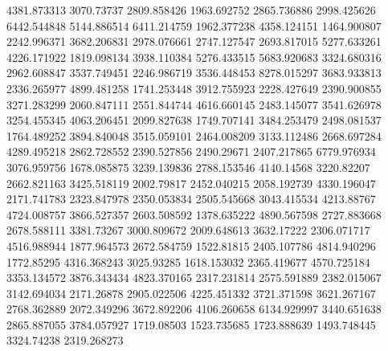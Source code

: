 4381.873313
3070.73737
2809.858426
1963.692752
2865.736886
2998.425626
6442.544848
5144.886514
6411.214759
1962.377238
4358.124151
1464.900807
2242.996371
3682.206831
2978.076661
2747.127547
2693.817015
5277.633261
4226.171922
1819.098134
3938.110384
5276.433515
5683.920683
3324.680316
2962.608847
3537.749451
2246.986719
3536.448453
8278.015297
3683.933813
2336.265977
4899.481258
1741.253448
3912.755923
2228.427649
2390.900855
3271.283299
2060.847111
2551.844744
4616.660145
2483.145077
3541.626978
3254.455345
4063.206451
2099.827638
1749.707141
3484.253479
2498.081537
1764.489252
3894.840048
3515.059101
2464.008209
3133.112486
2668.697284
4289.495218
2862.728552
2390.527856
2490.29671
2407.217865
6779.976934
3076.959756
1678.085875
3239.139836
2788.153546
4140.14568
3220.82207
2662.821163
3425.518119
2002.79817
2452.040215
2058.192739
4330.196047
2171.741783
2323.847978
2350.053834
2505.545668
3043.415534
4213.88767
4724.008757
3866.527357
2603.508592
1378.635222
4890.567598
2727.883668
2678.588111
3381.73267
3000.809672
2009.648613
3632.17222
2306.071717
4516.988944
1877.964573
2672.584759
1522.81815
2405.107786
4814.940296
1772.85295
4316.368243
3025.93285
1618.153032
2365.419677
4570.725184
3353.134572
3876.343434
4823.370165
2317.231814
2575.591889
2382.015067
3142.694034
2171.26878
2905.022506
4225.451332
3721.371598
3621.267167
2768.362889
2072.349296
3672.892206
4106.260658
6134.929997
3440.651638
2865.887055
3784.057927
1719.08503
1523.735685
1723.888639
1493.748445
3324.74238
2319.268273
